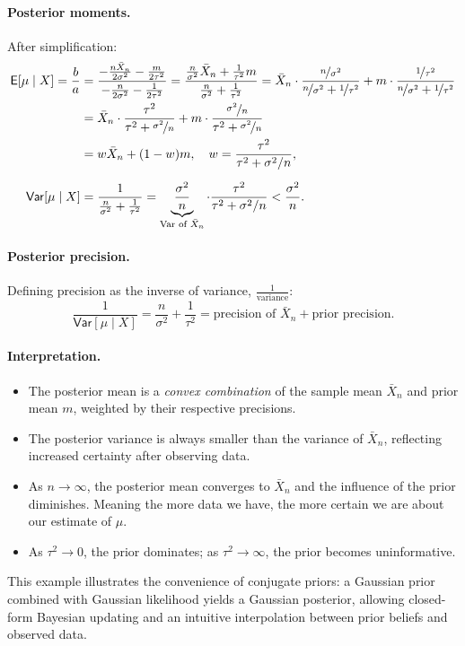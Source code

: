\begin{ex}
\paragraph{Posterior moments.} After simplification:
\begin{align*}
       \mathsf{E}[\mu\mid X] = \frac{b}{a }
       &= \frac{-\frac{n \bar{X}_{n}}{2\sigma^2} - \frac{m}{2\tau ^2}}{- \frac{n}{2\sigma^2}- \frac{1}{2\tau ^2}}
= \frac{\frac{n}{\sigma^2} \bar{X}_n + \frac{1}{\tau^2} m}{\frac{n}{\sigma^2} + \frac{1}{\tau^2}} 
       = \bar{X}_{n}\cdot \frac{\nicefrac{n}{\sigma^2}}{\nicefrac{n}{\sigma^2} + \nicefrac{1}{\tau ^2}} + m\cdot \frac{\nicefrac{1}{\tau ^2}}{\nicefrac{n}{\sigma ^2}+\nicefrac{1}{\tau ^2}}\\
       &= \bar{X}_{n}\cdot \frac{\tau ^2}{\tau ^2 + \nicefrac{\sigma ^2}{n}}+m\cdot \frac{\nicefrac{\sigma^2}{n}}{\tau ^2 + \nicefrac{\sigma^2}{n}}\\
&= w \bar{X}_n + (1-w) m, 
\quad w = \frac{\tau^2}{\tau^2 + \sigma^2/n},\\[2mm]
\mathsf{Var}[\mu \mid X] 
&= \frac{1}{\frac{n}{\sigma^2} + \frac{1}{\tau^2}} 
= \underbrace{\frac{\sigma^2}{n}}_{\text{Var of } \bar{X}_n} \cdot \frac{\tau^2}{\tau^2 + \sigma^2/n} < \frac{\sigma^2}{n}.
\end{align*}

\paragraph{Posterior precision.} Defining precision as the inverse of variance, \( \frac{1}{\text{variance}} \):
\[
\frac{1}{\mathsf{Var}[\mu \mid X]} = \frac{n}{\sigma^2} + \frac{1}{\tau^2} = \text{precision of } \bar{X}_n + \text{prior precision}.
\]

\paragraph{Interpretation.} 
\begin{itemize}
    \item The posterior mean is a \emph{convex combination} of the sample mean \(\bar{X}_n\) and prior mean \(m\), weighted by their respective precisions.
    \item The posterior variance is always smaller than the variance of \(\bar{X}_n\), reflecting increased certainty after observing data.
    \item As \(n \to \infty\), the posterior mean converges to \(\bar{X}_n\) and the influence of the prior diminishes.
    Meaning the more data we have, the more certain we are about our estimate of \(\mu\).
    \item As \(\tau^2 \to 0\), the prior dominates; as \(\tau^2 \to \infty\), the prior becomes uninformative.
\end{itemize}

This example illustrates the convenience of conjugate priors: a Gaussian prior combined with Gaussian likelihood yields a Gaussian posterior, allowing closed-form Bayesian updating and an intuitive interpolation between prior beliefs and observed data.
\end{ex}

